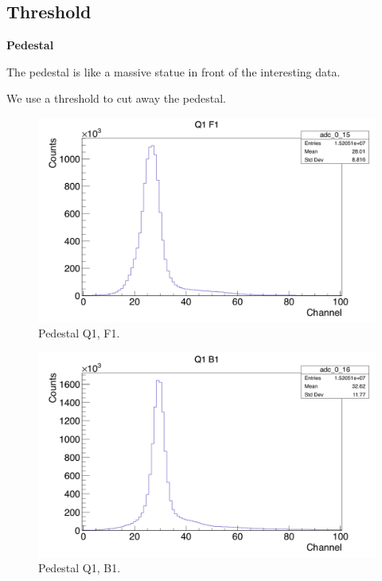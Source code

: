 \documentclass[twoside,english]{uiofysmaster/uiofysmaster}
\begin{document}
\subsection{Threshold}

\textbf{Pedestal}

The pedestal is like a massive statue in front of the interesting data. 


We use a threshold to cut away the pedestal.

\begin{figure}[ht]
	\centering
	\includegraphics[width=\textwidth]{../Plots/plotting/Pedestal_Q1_f1.png}
	\caption{Pedestal Q1, F1.}
	\label{fig:Pedestal_f}
\end{figure}

\begin{figure}[ht]
	\centering
	\includegraphics[width=\textwidth]{../Plots/plotting/Pedestal_Q1_b1.png}
	\caption{Pedestal Q1, B1.}
	\label{fig:Pedestal_b}
\end{figure}
\end{document}
